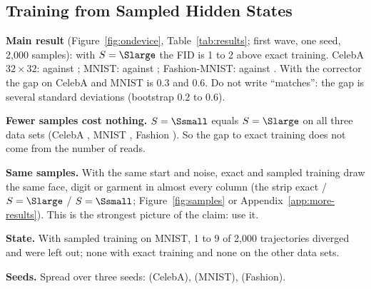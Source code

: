 \subsection{Training from Sampled Hidden States}
\begin{plan}
  \item \textbf{Main result} (Figure~\ref{fig:ondevice},
        Table~\ref{tab:results}; first wave, one seed, 2{,}000 samples): with
        $S=\Slarge$ the FID is 1 to 2 above exact training. CelebA
        $32\times32$: \FIDcelebLowSlarge{} against \FIDcelebLowExact; MNIST:
        \FIDmnistSlarge{} against \FIDmnistExact; Fashion-MNIST:
        \FIDfashionSlarge{} against \FIDfashionExact. With the corrector the
        gap on CelebA and MNIST is 0.3 and 0.6. Do not write ``matches'': the
        gap is several standard deviations (bootstrap 0.2 to 0.6).
  \item \textbf{Fewer samples cost nothing.} $S=\Ssmall$ equals $S=\Slarge$ on
        all three data sets (CelebA \FIDcelebLowSsmall, MNIST \FIDmnistSsmall,
        Fashion \FIDfashionSsmall). So the gap to exact training does not come
        from the number of reads. 
  \item \textbf{Same samples.} With the same start and noise, exact and sampled
        training draw the same face, digit or garment in almost every column
        (the strip exact / $S=\Slarge$ / $S=\Ssmall$; Figure~\ref{fig:samples}
        or Appendix~\ref{app:more-results}). This is the strongest picture of
        the claim: use it.
  \item \textbf{State.} With sampled training on MNIST, 1 to 9 of 2{,}000
        trajectories diverged and were left out; none with exact training and
        none on the other data sets. 
  \item \textbf{Seeds.} Spread over three seeds: \seedSdCelebLow{} (CelebA),
        \seedSdMnist{} (MNIST), \seedSdFashion{} (Fashion). 
\end{plan}

